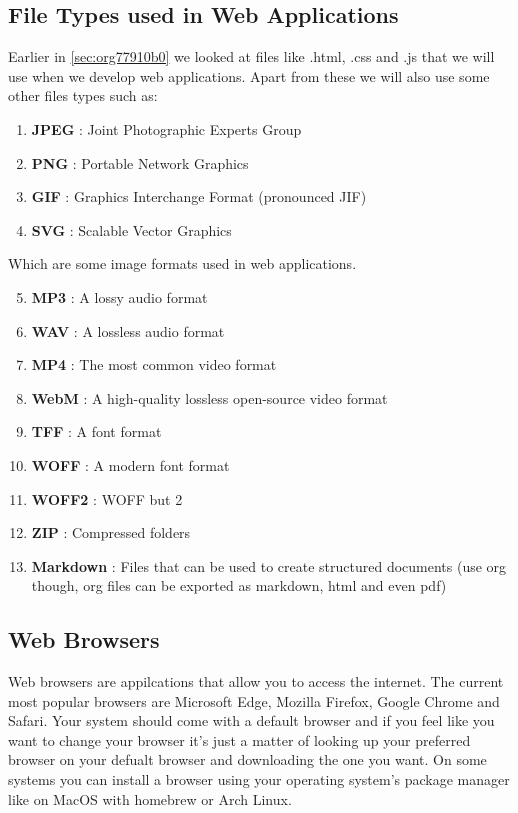 \documentclass[11pt]{article}
\begin{document}
\subsection{File Types used in Web Applications}
\label{sec:org7181872}
Earlier in \ref{sec:org77910b0} we looked at files like .html, .css and .js that we
will use when we develop web applications. Apart from these we will also use some other files types
such as:
\begin{enumerate}
\item \textbf{JPEG} : Joint Photographic Experts Group
\item \textbf{PNG} : Portable Network Graphics
\item \textbf{GIF} : Graphics Interchange Format (pronounced JIF)
\item \textbf{SVG} : Scalable Vector Graphics
\end{enumerate}
Which are some image formats used in web applications.
\begin{enumerate}
\setcounter{enumi}{4}
\item \textbf{MP3} : A lossy audio format
\item \textbf{WAV} : A lossless audio format
\item \textbf{MP4} : The most common video format
\item \textbf{WebM} : A high-quality lossless open-source video format
\item \textbf{TFF} : A font format
\item \textbf{WOFF} : A modern font format
\item \textbf{WOFF2} : WOFF but 2
\item \textbf{ZIP} : Compressed folders
\item \textbf{Markdown} : Files that can be used to create structured documents (use org though, org files can
be exported as markdown, html and even pdf)
\end{enumerate}
\subsection{Web Browsers}
\label{sec:orgf719896}
Web browsers are appilcations that allow you to access the internet. The current most popular
browsers are Microsoft Edge, Mozilla Firefox, Google Chrome and Safari. Your system should come with
a default browser and if you feel like you want to change your browser it's just a matter of looking
up your preferred browser on your defualt browser and downloading the one you want.
On some systems you can install a browser using your operating system's package manager like on
MacOS with homebrew or Arch Linux.
\end{document}
